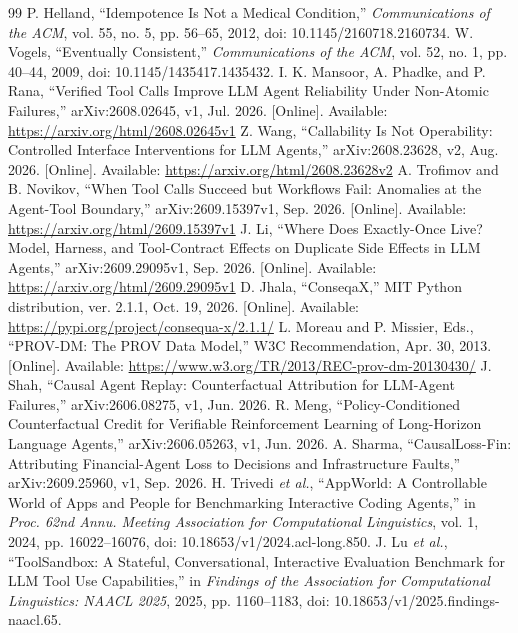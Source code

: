 \documentclass[conference]{IEEEtran}
\begin{document}
\FloatBarrier
\balance
\begin{thebibliography}{99}
P. Helland, ``Idempotence Is Not a Medical Condition,'' \emph{Communications of the ACM}, vol. 55, no. 5, pp. 56--65, 2012, doi: 10.1145/2160718.2160734.
W. Vogels, ``Eventually Consistent,'' \emph{Communications of the ACM}, vol. 52, no. 1, pp. 40--44, 2009, doi: 10.1145/1435417.1435432.
 I. K. Mansoor, A. Phadke, and P. Rana, ``Verified Tool Calls
Improve LLM Agent Reliability Under Non-Atomic Failures,'' arXiv:2608.02645,
v1, Jul. 2026. [Online]. Available: \url{https://arxiv.org/html/2608.02645v1}
 Z. Wang, ``Callability Is Not Operability: Controlled
Interface Interventions for LLM Agents,'' arXiv:2608.23628, v2, Aug. 2026. [Online]. Available: \url{https://arxiv.org/html/2608.23628v2}
A. Trofimov and B. Novikov, ``When Tool Calls Succeed but Workflows Fail: Anomalies at the Agent-Tool Boundary,'' arXiv:2609.15397v1, Sep. 2026. [Online]. Available: \url{https://arxiv.org/html/2609.15397v1}
J. Li, ``Where Does Exactly-Once Live? Model, Harness, and Tool-Contract Effects on Duplicate Side Effects in LLM Agents,'' arXiv:2609.29095v1, Sep. 2026. [Online]. Available: \url{https://arxiv.org/html/2609.29095v1}
 D. Jhala, ``ConseqaX,'' MIT Python distribution,
ver. 2.1.1, Oct. 19, 2026. [Online]. Available:
\url{https://pypi.org/project/consequa-x/2.1.1/}
L. Moreau and P. Missier, Eds., ``PROV-DM: The PROV Data Model,'' W3C Recommendation, Apr. 30, 2013. [Online]. Available: \url{https://www.w3.org/TR/2013/REC-prov-dm-20130430/}
 J. Shah, ``Causal Agent Replay: Counterfactual Attribution for
LLM-Agent Failures,'' arXiv:2606.08275, v1, Jun. 2026.
 R. Meng, ``Policy-Conditioned Counterfactual Credit for Verifiable
Reinforcement Learning of Long-Horizon Language Agents,'' arXiv:2606.05263, v1,
Jun. 2026.
 A. Sharma, ``CausalLoss-Fin: Attributing Financial-Agent
Loss to Decisions and Infrastructure Faults,'' arXiv:2609.25960, v1, Sep. 2026.
H. Trivedi \emph{et al.}, ``AppWorld: A Controllable World of Apps and People for Benchmarking Interactive Coding Agents,'' in \emph{Proc. 62nd Annu. Meeting Association for Computational Linguistics}, vol. 1, 2024, pp. 16022--16076, doi: 10.18653/v1/2024.acl-long.850.
J. Lu \emph{et al.}, ``ToolSandbox: A Stateful, Conversational, Interactive Evaluation Benchmark for LLM Tool Use Capabilities,'' in \emph{Findings of the Association for Computational Linguistics: NAACL 2025}, 2025, pp. 1160--1183, doi: 10.18653/v1/2025.findings-naacl.65.

\end{thebibliography}
\end{document}
